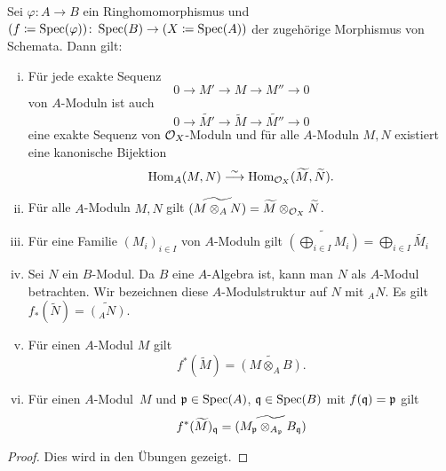 \begin{prop}
\label{prop:9.3}
Sei $\varphi\colon A \to B$ ein Ringhomomorphismus und $(f\coloneqq\operatorname{Spec}(\varphi)) \colon \operatorname{Spec}(B) \to (X \coloneqq \operatorname{Spec}(A))$ der zugehörige Morphismus von Schemata. Dann gilt:
	\begin{enumerate}[i)]
		\item Für jede exakte Sequenz
		\[
			0 \to M' \to M \to M'' \to 0
		\]
		von $A$-Moduln ist auch
		\[
			0 \to \widetilde{M'} \to \widetilde{M} \to \widetilde{M''} \to 0
		\]
		eine exakte Sequenz von $\mathcal{O}_X$-Moduln und für alle $A$-Moduln $M,N$ existiert eine kanonische Bijektion
		\[
			\operatorname{Hom}_A(M,N) \overset{\sim}{\longrightarrow} \operatorname{Hom}_{\mathcal{O}_X}(\widetilde{M},\widetilde{N}).
		\]
		\item Für alle $A$-Moduln $M,N$ gilt $\widetilde{(M\otimes_A N)} = \widetilde{M} \otimes_{\mathcal{O}_X} \widetilde{N}$.
		\item Für eine Familie $(M_i)_{i\in I}$ von $A$-Moduln gilt $\widetilde{(\bigoplus_{i\in I}M_i)} = \bigoplus_{i\in I} \widetilde{M_i}$
		\item Sei $N$ ein $B$-Modul. Da $B$ eine $A$-Algebra ist, kann man $N$ als $A$-Modul betrachten. Wir bezeichnen diese $A$-Modulstruktur auf $N$ mit $_{A}N$. Es gilt $f_*(\widetilde{N}) = \widetilde{(_{A}N)}$.
		\item Für einen $A$-Modul $M$ gilt
		\[
			f^*(\widetilde{M}) = \widetilde{(M \otimes_A B)}.
		\]
		\item Für einen $A$-Modul~$M$ und $\mathfrak{p} \in \operatorname{Spec}(A)$, $\mathfrak{q} \in \operatorname{Spec}(B)$ mit $f(\mathfrak{q}) = \mathfrak{p}$ gilt
		\[
			f^*(\widetilde{M})_{\mathfrak{q}} = \widetilde{(M_{\mathfrak{p}} \otimes_{A_{\mathfrak{p}}} B_{\mathfrak{q}})}
		\]
	\end{enumerate}
	\begin{proof}
		Dies wird in den Übungen gezeigt.
	\end{proof}
\end{prop}

